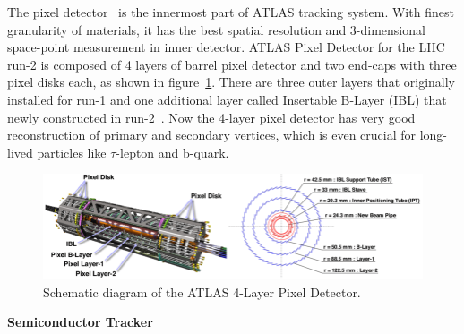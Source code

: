 The pixel detector~\cite{pixel_2008} is the innermost part of ATLAS tracking system.
With finest granularity of materials, it has the best spatial resolution and 3-dimensional space-point measurement in inner detector.
ATLAS Pixel Detector for the LHC run-2 is composed of 4 layers of barrel pixel detector and two end-caps with three pixel disks each, as shown in figure~\ref{fig:inner_pixel}.
There are three outer layers that originally installed for run-1 and one additional layer called Insertable B-Layer (IBL) that newly constructed in run-2~\cite{Mullier:2016}.
Now the 4-layer pixel detector has very good reconstruction of primary and secondary vertices, which is even crucial for long-lived particles like $\tau$-lepton and b-quark.
\begin{figure}[!htb]
  \centering
  \includegraphics[width=1.0\textwidth]{figures/Detector/inner_pixel.png}
  \caption{Schematic diagram of the ATLAS 4-Layer Pixel Detector.}
  \label{fig:inner_pixel}
\end{figure}

\textbf{Semiconductor Tracker}

